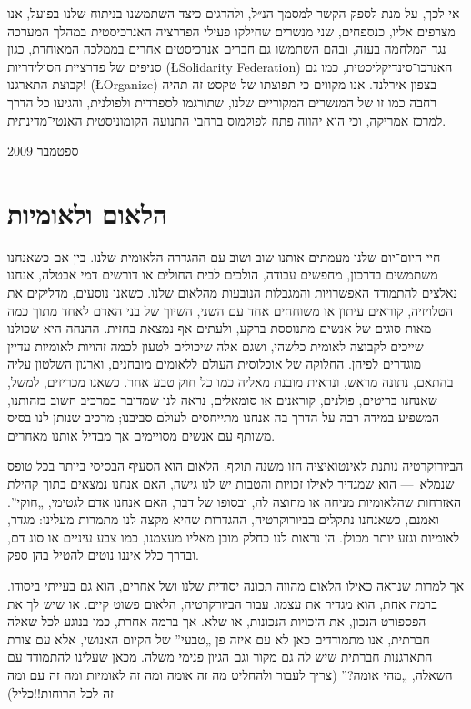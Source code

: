 אי לכך, על מנת לספק הקשר למסמך הנ״ל, ולהדגים כיצד השתמשנו בניתוח שלנו בפועל, אנו מצרפים אליו, כנספחים, שני מנשרים שחילקו פעילי הפדרציה האנרכיסטית במהלך המערכה נגד המלחמה בעזה, ובהם השתמשו גם חברים אנרכיסטים אחרים בממלכה המאוחדת, כגון סניפים של פדרציית הסולידריות (\L{Solidarity Federation}) האנרכו־סינדיקליסטית, כמו גם קבוצת התארגנו! (\L{Organize}) בצפון אירלנד. אנו מקווים כי תפוצתו של טקסט זה תהיה רחבה כמו זו של המנשרים המקוריים שלנו, שתורגמו לספרדית ולפולנית, והגיעו כל הדרך למרכז אמריקה, וכי הוא יהווה פתח לפולמוס ברחבי התנועה הקומוניסטית האנטי־מדינתית.

ספטמבר 2009

\section*{הלאום ולאומיות}

חיי היום־יום שלנו מעמתים אותנו שוב ושוב עם ההגדרה הלאומית שלנו. בין אם כשאנחנו משתמשים בדרכון, מחפשים עבודה, הולכים לבית החולים או דורשים דמי אבטלה, אנחנו נאלצים להתמודד האפשרויות והמגבלות הנובעות מהלאום שלנו. כשאנו נוסעים, מדליקים את הטלויזיה, קוראים עיתון או משוחחים אחד עם השני, השיוך של בני האדם לאחד מתוך כמה מאות סוגים של אנשים מתנוססת ברקע, ולעתים אף נמצאת בחזית. ההנחה היא שכולנו שייכים לקבוצה לאומית כלשהי, ושגם אלה שיכולים לטעון לכמה זהויות לאומיות עדיין מוגדרים לפיהן. החלוקה של אוכלוסית העולם ללאומים מובחנים, וארגון השלטון עליה בהתאם, נתונה מראש, ונראית מובנת מאליה כמו כל חוק טבע אחר. כשאנו מכריזים, למשל, שאנחנו בריטים, פולנים, קוראנים או סומאלים, נראה לנו שמדובר במרכיב חשוב בזהותנו, המשפיע במידה רבה על הדרך בה אנחנו מתייחסים לעולם סביבנו; מרכיב שנותן לנו בסיס משותף עם אנשים מסויימים אך מבדיל אותנו מאחרים.

הביורוקרטיה נותנת לאינטואיציה הזו משנה תוקף. הלאום הוא הסעיף הבסיסי ביותר בכל טופס שנמלא~— הוא שמגדיר לאילו זכויות והטבות יש לנו גישה, האם אנחנו נמצאים בתוך קהילת האזרחות שהלאומיות מניחה או מחוצה לה, ובסופו של דבר, האם אנחנו אדם לגטימי, „חוקי”. ואמנם, כשאנחנו נתקלים בביורוקרטיה, ההגדרות שהיא מקצה לנו מתמרות מעלינו: מגדר, לאומיות וגזע יותר מכולן. הן נראות לנו כחלק מובן מאליו מעצמנו, כמו צבע עיניים או סוג דם, ובדרך כלל איננו נוטים להטיל בהן ספק.

אך למרות שנראה כאילו הלאום מהווה תכונה יסודית שלנו ושל אחרים, הוא גם בעייתי ביסודו. ברמה אחת, הוא מגדיר את עצמו. עבור הביורקרטיה, הלאום פשוט קיים. או שיש לך את הפספורט הנכון, את הזכויות הנכונות, או שלא. אך ברמה אחרת, כמו בנוגע לכל שאלה חברתית, אנו מתמודדים כאן לא עם איזה פן „טבעי” של הקיום האנושי, אלא עם צורת התארגנות חברתית שיש לה גם מקור וגם הגיון פנימי משלה. מכאן שעלינו להתמודד עם השאלה, „מהי אומה?” (צריך לעבור ולהחליט מה זה אומה ומה זה לאומיות ומה זה עם ומה זה לכל הרוחות!!כליל)


